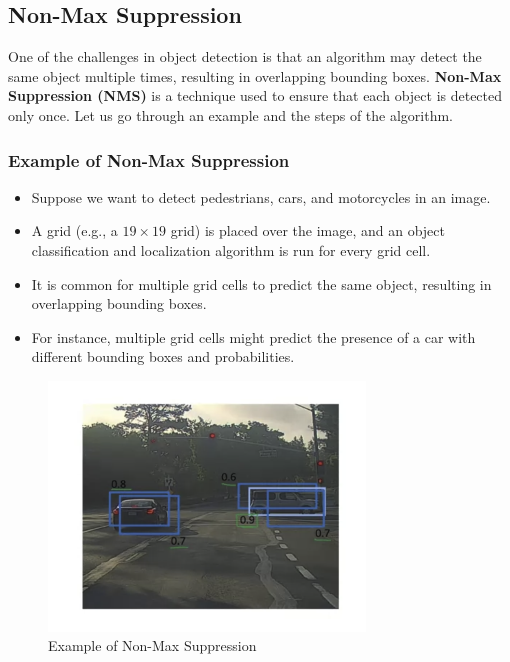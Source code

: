 \documentclass[letterpaper,12pt,notitlepage,twoside]{report}
\begin{document}
\subsection*{Non-Max Suppression}
One of the challenges in object detection is that an algorithm may detect the same object multiple times, resulting in overlapping bounding boxes. \textbf{Non-Max Suppression (NMS)} is a technique used to ensure that each object is detected only once. Let us go through an example and the steps of the algorithm.

\subsubsection*{Example of Non-Max Suppression}
\begin{itemize}[nosep]
    \item Suppose we want to detect pedestrians, cars, and motorcycles in an image.
    \item A grid (e.g., a $19 \times 19$ grid) is placed over the image, and an object classification and localization algorithm is run for every grid cell.
    \item It is common for multiple grid cells to predict the same object, resulting in overlapping bounding boxes.
    \item For instance, multiple grid cells might predict the presence of a car with different bounding boxes and probabilities.
\end{itemize}

\begin{figure}[h]
	\centering
	\includegraphics[width=0.75\textwidth]{Images/Non-Max Suppression Example.png}
	\caption{Example of Non-Max Suppression}
	\label{fig:43}
\end{figure}
\FloatBarrier
\end{document}
